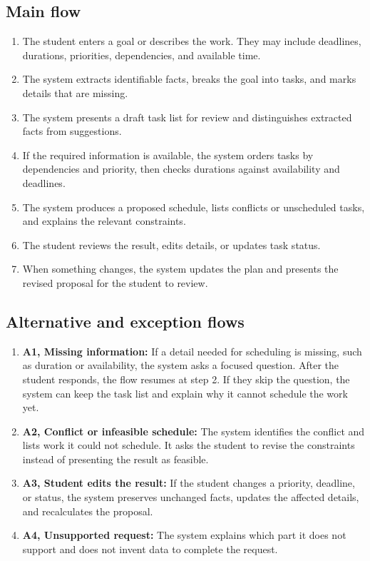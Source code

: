 \subsection*{Main flow}
\begin{enumerate}
  \item The student enters a goal or describes the work. They may include deadlines, durations, priorities, dependencies, and available time.
  \item The system extracts identifiable facts, breaks the goal into tasks, and marks details that are missing.
  \item The system presents a draft task list for review and distinguishes extracted facts from suggestions.
  \item If the required information is available, the system orders tasks by dependencies and priority, then checks durations against availability and deadlines.
  \item The system produces a proposed schedule, lists conflicts or unscheduled tasks, and explains the relevant constraints.
  \item The student reviews the result, edits details, or updates task status.
  \item When something changes, the system updates the plan and presents the revised proposal for the student to review.
\end{enumerate}

\subsection*{Alternative and exception flows}
\begin{enumerate}
  \item \textbf{A1, Missing information:} If a detail needed for scheduling is missing, such as duration or availability, the system asks a focused question. After the student responds, the flow resumes at step 2. If they skip the question, the system can keep the task list and explain why it cannot schedule the work yet.
  \item \textbf{A2, Conflict or infeasible schedule:} The system identifies the conflict and lists work it could not schedule. It asks the student to revise the constraints instead of presenting the result as feasible.
  \item \textbf{A3, Student edits the result:} If the student changes a priority, deadline, or status, the system preserves unchanged facts, updates the affected details, and recalculates the proposal.
  \item \textbf{A4, Unsupported request:} The system explains which part it does not support and does not invent data to complete the request.
\end{enumerate}

